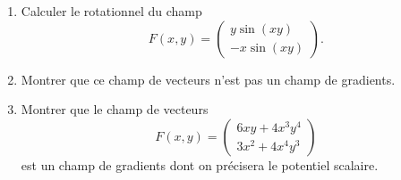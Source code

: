 
\begin{exercice}\label{exoexamens-0003}

    \begin{enumerate}
        \item
    Calculer le rotationnel du champ
    \begin{equation}
        F(x,y)=\begin{pmatrix}
            y\sin(xy)    \\ 
            -x\sin(xy)    
        \end{pmatrix}.
    \end{equation}

\item
    Montrer que ce champ de vecteurs n'est pas un champ de gradients.
\item
    Montrer que le champ de vecteurs
    \begin{equation}
        F(x,y)=\begin{pmatrix}
            6xy+4x^3y^4    \\ 
            3x^2+4x^4y^3    
        \end{pmatrix}
    \end{equation}
    est un champ de gradients dont on précisera le potentiel scalaire.
            
    \end{enumerate}

\end{exercice}
